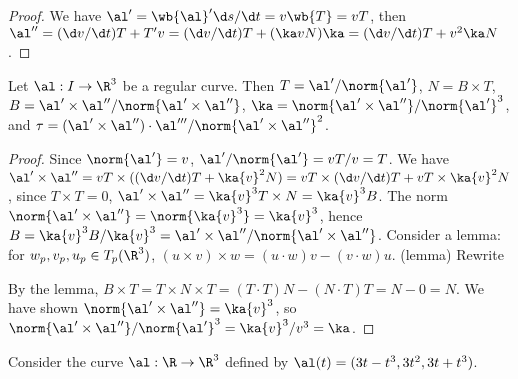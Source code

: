 \documentclass[10pt]{article}
\begin{document}
\begin{proof}
    We have $\al'=\wb{\al}'\d s/\d t=v\wb{T}=vT$, then $\al''=(\d v/\d t)T+T'v=(\d v/\d t)T+(\ka vN)\ka=(\d v/\d t)T+{v}^{2}\ka N$.
\end{proof}
\begin{proposition}
    Let $\al:I\to{\R}^{3}$ be a regular curve. Then $T=\al'/\norm{\al'}$, $N=B\times T$, $B=\al'\times\al''/\norm{\al'\times\al''}$, $\ka=\norm{\al'\times\al''}/{\norm{\al'}}^{3}$, and $\tau=(\al'\times\al'')\cdot\al'''/{\norm{\al'\times\al''}}^{2}$.
\end{proposition}
\begin{proof}
    Since $\norm{\al'}=v$, $\al'/\norm{\al'}=vT/v=T$. We have $\al'\times\al''=vT\times((\d v/\d t)T+\ka{v}^{2}N)=vT\times(\d v/\d t)T+vT\times\ka{v}^{2}N$, since $T\times T=0$, $\al'\times\al''=\ka{v}^{3}T\times N=\ka{v}^{3}B$. The norm $\norm{\al'\times\al''}=\norm{\ka{v}^{3}}=\ka{v}^{3}$, hence $B=\ka{v}^{3}B/\ka{v}^{3}=\al'\times\al''/\norm{\al'\times\al''}$. Consider a lemma: for ${w}_{p},{v}_{p},{u}_{p}\in{T}_{p}({\R}^{3})$, $(u\times v)\times w=(u\cdot w)v-(v\cdot w)u$. (lemma) Rewrite

    By the lemma, $B\times T=T\times N\times T=(T\cdot T)N-(N\cdot T)T=N-0=N$. We have shown $\norm{\al'\times\al''}=\ka{v}^{3}$, so $\norm{\al'\times\al''}/{\norm{\al'}}^{3}=\ka{v}^{3}/{v}^{3}=\ka$. 
\end{proof}
\begin{example}
    Consider the curve $\al:\R\to{\R}^{3}$ defined by $\al(t)=(3t-{t}^{3},3{t}^{2},3t+{t}^{3})$.
\end{example}


\hindex
\end{document}
